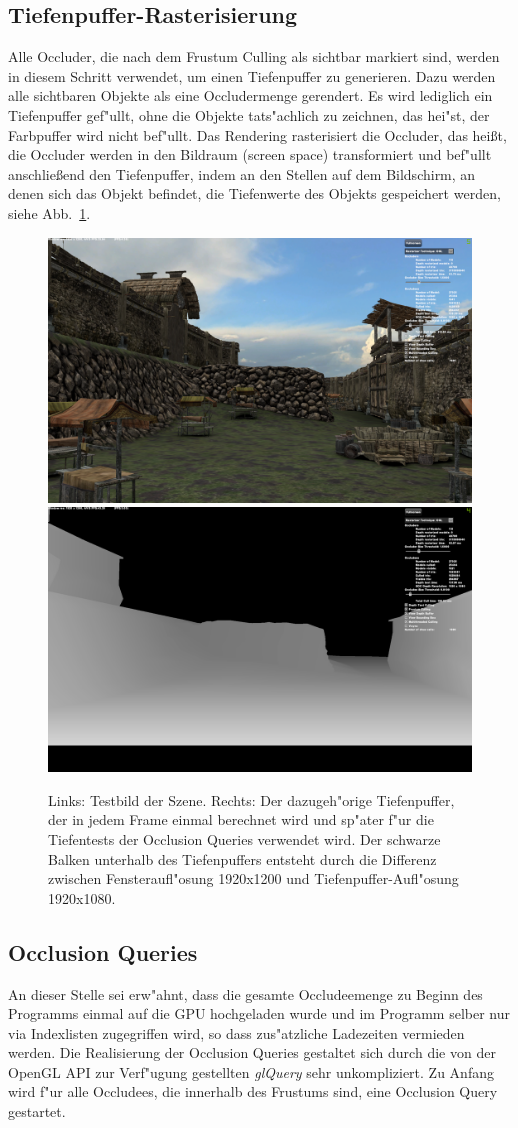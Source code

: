 \documentclass[journal]{vgtc}
\begin{document}
\subsection{Tiefenpuffer-Rasterisierung}
Alle Occluder, die nach dem Frustum Culling als sichtbar markiert sind, werden in diesem Schritt verwendet, um einen Tiefenpuffer zu generieren.
Dazu werden alle sichtbaren Objekte als eine Occludermenge \glqq gerendert\grqq{}.
Es wird lediglich ein Tiefenpuffer gef"ullt, ohne die Objekte tats"achlich zu zeichnen, das hei"st, der Farbpuffer wird nicht bef"ullt.
Das Rendering rasterisiert die Occluder, das hei{\ss}t, die Occluder werden in den Bildraum (screen space) transformiert und bef"ullt anschlie{\ss}end den Tiefenpuffer, indem an den Stellen auf dem Bildschirm, an denen sich das Objekt befindet, die Tiefenwerte des Objekts gespeichert werden, siehe Abb.\ \ref{fig:db}.
\begin{figure}[h]%
\includegraphics[width=0.5\columnwidth]{images/Base1.png}%
\includegraphics[width=0.5\columnwidth]{images/Base1DB.png}%
\caption{Links: Testbild der Szene. Rechts: Der dazugeh"orige Tiefenpuffer, der in jedem Frame einmal berechnet wird und sp"ater f"ur die Tiefentests der Occlusion Queries verwendet wird. Der schwarze Balken unterhalb des Tiefenpuffers entsteht durch die Differenz zwischen Fensteraufl"osung 1920x1200 und Tiefenpuffer-Aufl"osung 1920x1080.}%
\label{fig:db}%
\end{figure}


\subsection{Occlusion Queries}
An dieser Stelle sei erw"ahnt, dass die gesamte Occludeemenge zu Beginn des Programms einmal auf die GPU hochgeladen wurde und im Programm selber nur via Indexlisten zugegriffen wird, so dass zus"atzliche Ladezeiten vermieden werden.
Die Realisierung der Occlusion Queries gestaltet sich durch die von der OpenGL API zur Verf"ugung gestellten \textit{glQuery} sehr unkompliziert.
Zu Anfang wird f"ur alle Occludees, die innerhalb des Frustums sind, eine Occlusion Query gestartet.
\end{document}
